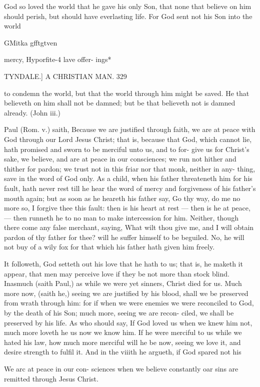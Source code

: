 \documentclass{custom}
\begin{document}
{God so loved the world that he gave his only Son, that 
none that believe on him should perish, but should have 
everlasting life. For God sent not his Son into the world 

GMitka 
gfftgtven 

mercy, 
Hyporfite-4 
lave offer- 
ings* 


TYNDALE.]
A CHRISTIAN MAN.
329

to condemn the world, but that the world through him 
might be saved. He that believeth on him shall not be 
damned; but be that believeth not is damned already. 
(John iii.) 

Paul (Rom. v.) saith, Because we are justified through 
faith, we are at peace with God through our Lord Jesus 
Christ; that is, because that God, which cannot lie, hath 
promised and sworn to be merciful unto us, and to for- 
give us for Christ's sake, we believe, and are at peace in 
our consciences; we run not hither and thither for pardon; 
we trust not in this friar nor that monk, neither in any- 
thing, save in the word of God only. As a child, when 
his father threateneth him for his fault, hath never rest till 
he hear the word of mercy and forgiveness of his father's 
mouth again; but as soon as he heareth his father say, 
Go thy way, do me no more so, I forgive thee this fault: 
then is his heart at rest — then is he at peace, — then 
runneth he to no man to make intercession for him. 
Neither, though there come any false merchant, saying, 
What wilt thou give me, and I will obtain pardon of thy 
father for thee? will he suffer himself to be beguiled. 
No, he will not buy of a wily fox for that which his father 
hath given him freely. 

It followeth, God setteth out his love that he hath to us; 
that is, he maketh it appear, that men may perceive love if 
they be not more than stock blind. Inasmuch (saith 
Paul,) as while we were yet sinners, Christ died for us. 
Much more now, (saith he,) seeing we are justified by his 
blood, shall we be preserved from wrath through him: 
for if when we were enemies we were reconciled to God, 
by the death of his Son; much more, seeing we are recon- 
ciled, we shall be preserved by his life. As who should 
say, If God loved us when we knew him not, much more 
loveth he us now we know him. If he were merciful to 
us while we hated his law, how much more merciful will 
he be now, seeing we love it, and desire strength to fulfil 
it. And in the viiith he argueth, if God spared not his 

We arc at 
peace in 
our con- 
sciences 
when we 
believe 
constantly 
oar sins are 
remitted 
through 
Jesus 
Christ. 


}
\end{document}
